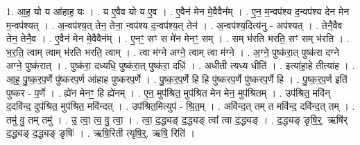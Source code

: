 \documentclass[17pt]{extarticle}
\begin{document}
1. आ॒ह॒ यो य आ॑हाह॒ यः । . य ए॒वैव यो य ए॒व । . ए॒वैन॑ मेन मे॒वैवैन᳚म् । . ए॒न॒ म॒न्वप॑श्य द॒न्वप॑श्य देन मेन म॒न्वप॑श्यत् । . अ॒न्वप॑श्य॒त् तेन॒ तेना॒ न्वप॑श्य द॒न्वप॑श्य॒त् तेन॑ । . अ॒न्वप॑श्य॒दित्य॑नु - अप॑श्यत् । . तेनै॒वैव तेन॒ तेनै॒व । . ए॒वैन॑ मेन मे॒वैवैन᳚म् । . ए॒नꣳ॒॒ सꣳ स मे॑न मेनꣳ॒॒ सम् । . सम् भ॑रति भरति॒ सꣳ सम् भ॑रति । . भ॒र॒ति॒ त्वाम् त्वाम् भ॑रति भरति॒ त्वाम् । . त्वा म॑ग्ने अग्ने॒ त्वाम् त्वा म॑ग्ने । . अ॒ग्ने॒ पुष्क॑रा॒त् पुष्क॑रा दग्ने अग्ने॒ पुष्क॑रात् । . पुष्क॑रा॒ दध्यधि॒ पुष्क॑रा॒त् पुष्क॑रा॒ दधि॑ । . अधीती त्यध्य धीति॑ । . इत्या॑हा॒हे तीत्या॑ह । . आ॒ह॒ पु॒ष्क॒र॒प॒र्णे पु॑ष्करप॒र्ण आ॑हाह पुष्करप॒र्णे । . पु॒ष्क॒र॒प॒र्णे हि हि पु॑ष्करप॒र्णे पु॑ष्करप॒र्णे हि । . पु॒ष्क॒र॒प॒र्ण इति॑ पुष्कर - प॒र्णे । . ह्ये॑न मेनꣳ॒॒ हि ह्ये॑नम् । . ए॒न॒ मुप॑श्रित॒ मुप॑श्रित मेन मेन॒ मुप॑श्रितम् । . उप॑श्रित॒ मवि॑न् द॒दवि॑न्द॒ दुप॑श्रित॒ मुप॑श्रित॒ मवि॑न्दत् । . उप॑श्रित॒मित्युप॑ - श्रि॒त॒म् । . अवि॑न्द॒त् तम् त मवि॑न्द॒ दवि॑न्द॒त् तम् । . तमु॑ वु॒ तम् तमु॑ । . उ॒ त्वा॒ त्व॒ वु॒ त्वा॒ । . त्वा॒ द॒द्ध्यङ् द॒द्ध्यङ् त्वा᳚ त्वा द॒द्ध्यङ् । . द॒द्ध्यङ् ङृषि॒र्॒. ऋषि॑र् द॒द्ध्यङ् द॒द्ध्यङ् ङृषिः॑ । . ऋषि॒रिती त्यृषि॒र्॒. ऋषि॒ रिति॑ । \newline
\end{document}
